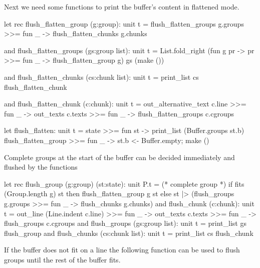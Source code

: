 \documentclass[12pt]{article}
\begin{document}
%
Next we need some functions to print the buffer's content in flattened mode.
\begin{ocaml}
    let rec flush_flatten_group (g:group): unit t =
      flush_flatten_groups g.groups >>= fun _ ->
      flush_flatten_chunks g.chunks

    and flush_flatten_groups (gs:group list): unit t =
      List.fold_right
        (fun g pr -> pr >>= fun _ -> flush_flatten_group g)
        gs
        (make ())

    and flush_flatten_chunks (cs:chunk list): unit t =
      print_list cs flush_flatten_chunk

    and flush_flatten_chunk (c:chunk): unit t =
      out_alternative_text c.line >>= fun _ ->
      out_texts c.texts >>= fun _ ->
      flush_flatten_groups c.cgroups

    let flush_flatten: unit t =
      state >>= fun st ->
      print_list (Buffer.groups st.b) flush_flatten_group >>= fun _ ->
      st.b <- Buffer.empty;
      make ()
\end{ocaml}
%
Complete groups at the start of the buffer can be decided immediately and
flushed by the functions
\begin{ocaml}
    let rec flush_group (g:group) (st:state): unit P.t =
      (* complete group *)
      if fits (Group.length g) st then
        flush_flatten_group g st
      else
        st
        |> (flush_groups g.groups >>= fun _ ->
            flush_chunks g.chunks)
    and flush_chunk (c:chunk): unit t =
      out_line (Line.indent c.line) >>= fun _ ->
      out_texts c.texts >>= fun _ ->
      flush_groups c.cgroups
    and flush_groups (gs:group list): unit t =
      print_list gs flush_group
    and flush_chunks (cs:chunk list): unit t =
      print_list cs flush_chunk
\end{ocaml}
If the buffer does not fit on a line the following function can be used to
flush groups until the rest of the buffer fits.
\end{document}
